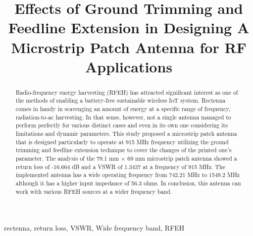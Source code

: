 \documentclass[conference]{IEEEtran}
\begin{document}
\title{Effects of Ground Trimming and Feedline Extension in Designing A Microstrip Patch Antenna for RF Applications}

\author{
}



\maketitle
\IEEEpubidadjcol

\begin{abstract}
  Radio-frequency energy harvesting (RFEH) has attracted significant interest as one of the methods of enabling a battery-free sustainable wireless IoT system. Rectenna comes in handy in scavenging an amount of energy at a specific range of frequency, radiation-to-ac harvesting. In that sense, however, not a single antenna managed to perform perfectly for various distinct cases and even in its own one considering its limitations and dynamic parameters. This study proposed a microstrip patch antenna that is designed particularly to operate at 915 MHz frequency utilizing the ground trimming and feedline extension technique to cover the changes of the printed one's parameter. The analysis of the 79.1 mm $\times$ 69 mm microstrip patch antenna showed a return loss of -16.664 dB and a VSWR of 1.3437 at a frequency of 915 MHz. The implemented antenna has a wide operating frequency from 742.21 MHz to 1549.2 MHz although it has a higher input impedance of 56.3 ohms. In conclusion, this antenna can work with various RFEH sources at a wider frequency band.
\end{abstract}

\begin{IEEEkeywords}
  rectenna, return loss, VSWR, Wide frequency band, RFEH
\end{IEEEkeywords}
\end{document}

